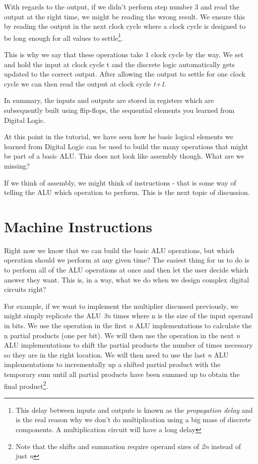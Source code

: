 With regards to the output, if we didn’t perform step number 3 and read the output at the right time, we might be reading the wrong result. We ensure this by reading the output in the next clock cycle where a clock cycle is designed to be long enough for all values to settle\footnote{This delay between inputs and outputs is known as the {\em propagation delay} and is the real reason why we don't do multiplication using a big mass of discrete components. A multiplication circuit will have a long delay}.

This is why we say that these operations take 1 clock cycle by the way. We set and hold the input at clock cycle t and the discrete logic automatically gets updated to the correct output. After allowing the output to settle for one clock cycle we can then read the output at clock cycle {\em t+1}. 

In summary, the inputs and outputs are stored in registers which are subsequently built using flip-flops, the sequential elements you learned from Digital Logic. 

At this point in the tutorial, we have seen how he basic logical elements we learned from Digital Logic can be used to build the many operations that might be part of a basic ALU. This does not look like assembly though. What are we missing?

If we think of assembly, we might think of instructions - that is some way of telling the ALU which operation to perform. This is the next topic of discussion.

\section{Machine Instructions}

Right now we know that we can build the basic ALU operations, but which operation should we perform at any given time? The easiest thing for us to do is to perform all of the ALU operations at once and then let the user decide which answer they want. This is, in a way, what we do when we design complex digital circuits right? 

For example, if we want to implement the multiplier discussed previously, we might simply replicate the ALU {\em 3n} times where n is the size of the input operand in bits. We use the  operation in the first {\em n} ALU implementations to calculate the n partial products (one per bit). We will then use the  operation in the next {\em n} ALU implementations to shift the partial products the number of times necessary so they are in the right location. We will then need to use the last {\em n} ALU implementations to incrementally  up a shifted partial product with the temporary sum until all partial products have been summed up to obtain the final product\footnote{Note that the shifts and summation require operand sizes of {\em 2n} instead of just {\em n}}.


